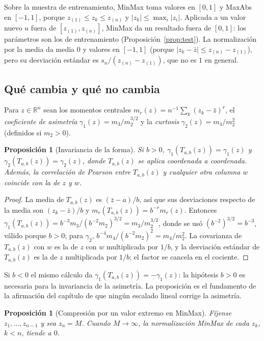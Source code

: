 \documentclass[11pt,a4paper]{article}
\theoremstyle{plain}
\newtheorem{proposicion}[teorema]{Proposición}
\theoremstyle{definition}
\theoremstyle{remark}
\newcommand{\R}{\mathbb{R}}
\newcommand{\1}{\mathbf{1}}
\begin{document}
Sobre la muestra de entrenamiento, MinMax toma valores en $[0,1]$ y MaxAbs
en $[-1,1]$, porque $z_{(1)}\le z_k\le z_{(n)}$ y $|z_k|\le\max_i|z_i|$.
Aplicada a un valor nuevo $u$ fuera de $[z_{(1)},z_{(n)}]$, MinMax da un
resultado fuera de $[0,1]$: los parámetros son los de entrenamiento
(Proposición~\ref{prop:test}). La normalización por la media da media $0$
y valores en $[-1,1]$ (porque $|z_k-\bar z|\le z_{(n)}-z_{(1)}$), pero su
desviación estándar es $s_n/(z_{(n)}-z_{(1)})$, que no es $1$ en general.

\subsection{Qué cambia y qué no cambia}

Para $z\in\R^n$ sean los momentos centrales $m_r(z)=n^{-1}\sum_k(z_k-\bar
z)^r$, el \emph{coeficiente de asimetría} $\gamma_1(z)=m_3/m_2^{3/2}$ y la
\emph{curtosis} $\gamma_2(z)=m_4/m_2^2$ (definidos si $m_2>0$).

\begin{proposicion}[Invariancia de la forma]\label{prop:forma}
Si $b>0$, $\gamma_1(T_{a,b}(z))=\gamma_1(z)$ y
$\gamma_2(T_{a,b}(z))=\gamma_2(z)$, donde $T_{a,b}(z)$ se aplica
coordenada a coordenada. Además, la correlación de Pearson entre
$T_{a,b}(z)$ y cualquier otra columna $w$ coincide con la de $z$ y $w$.
\end{proposicion}

\begin{proof}
La media de $T_{a,b}(z)$ es $(\bar z-a)/b$, así que sus desviaciones
respecto de la media son $(z_k-\bar z)/b$ y $m_r(T_{a,b}(z))=b^{-r}m_r(z)$.
Entonces
$\gamma_1(T_{a,b}(z))=b^{-3}m_3/(b^{-2}m_2)^{3/2}=m_3/m_2^{3/2}$, donde se
usó $(b^{-2})^{3/2}=b^{-3}$, válido porque $b>0$; para $\gamma_2$,
$b^{-4}m_4/(b^{-2}m_2)^2=m_4/m_2^2$. La covarianza de $T_{a,b}(z)$ con $w$
es la de $z$ con $w$ multiplicada por $1/b$, y la desviación estándar de
$T_{a,b}(z)$ es la de $z$ multiplicada por $1/b$; el factor se cancela en
el cociente.
\end{proof}

Si $b<0$ el mismo cálculo da $\gamma_1(T_{a,b}(z))=-\gamma_1(z)$: la
hipótesis $b>0$ es necesaria para la invariancia de la asimetría. La
proposición es el fundamento de la afirmación del capítulo de que ningún
escalado lineal corrige la asimetría.

\begin{proposicion}[Compresión por un valor extremo en MinMax]\label{prop:minmax}
Fíjense $z_1,\dots,z_{n-1}$ y sea $z_n=M$. Cuando $M\to\infty$, la
normalización MinMax de cada $z_k$, $k<n$, tiende a $0$.
\end{proposicion}
\end{document}
